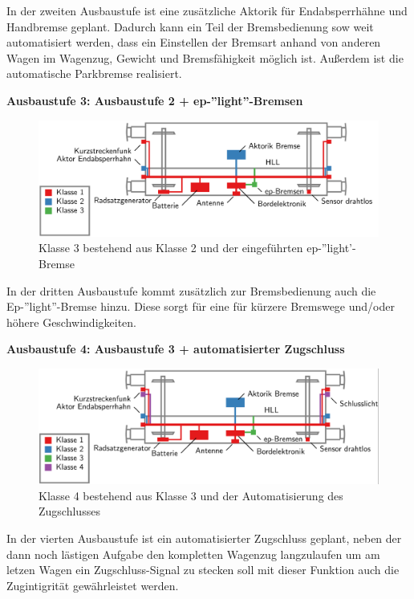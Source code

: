 In der zweiten Ausbaustufe ist eine zusätzliche Aktorik für Endabsperrhähne und Handbremse geplant. Dadurch kann ein Teil der Bremsbedienung sow weit automatisiert werden, dass ein Einstellen der Bremsart anhand von anderen Wagen im Wagenzug, Gewicht und Bremsfähigkeit möglich ist. Außerdem ist die automatische Parkbremse realisiert.\par
\textbf{Ausbaustufe 3: Ausbaustufe 2 + ep-''light''-Bremsen}\par
\begin{figure}[htbp] 
    \includegraphics[width=\textwidth]{Bilder/Ausbaustufen_3.PNG}
    \caption{Klasse 3 bestehend aus Klasse 2 und der eingeführten ep-''light'-Bremse}
    \label{fig:Klasse3}
\end{figure} 
In der dritten Ausbaustufe kommt zusätzlich zur Bremsbedienung auch die Ep-''light''-Bremse hinzu. Diese sorgt für eine für kürzere Bremswege und/oder höhere Geschwindigkeiten.\par
\textbf{Ausbaustufe 4: Ausbaustufe 3 + automatisierter Zugschluss}\par
\begin{figure}[htbp] 
    \includegraphics[width=\textwidth]{Bilder/Ausbaustufen_4.PNG}
    \caption{Klasse 4 bestehend aus Klasse 3 und der Automatisierung des Zugschlusses}
    \label{fig:Klasse4}
\end{figure} 
In der vierten Ausbaustufe ist ein automatisierter Zugschluss geplant, neben der dann noch lästigen Aufgabe den kompletten Wagenzug langzulaufen um am letzen Wagen ein Zugschluss-Signal zu stecken soll mit dieser Funktion auch die Zugintigrität gewährleistet werden.\par
